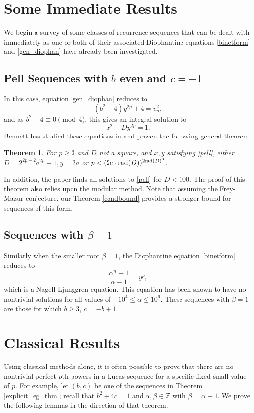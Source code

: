 \documentclass[12pt]{amsart}
\newtheorem{thm}{Theorem}[section]
\theoremstyle{definition}
\def\Z{{\mathbb Z}}
\newcommand{\rad}{{\rm{rad}}}
\begin{document}
\section{Some Immediate Results}

We begin a survey of some classes of recurrence sequences that can be dealt with immediately as one or both of their associated Diophantine equations \ref{binetform} and \ref{gen_diophan} have already been investigated.

\subsection{Pell Sequences with $b$ even and $c = -1$}

In this case, equation \ref{gen_diophan} reduces to
\[ (b^2-4)y^{2p}+4 = v_n^2, \]
and as $b^2-4 \equiv 0 \pmod{4}$, this gives an integral solution to 
\begin{equation}\label{pell} x^2 - Dy^{2p} = 1.\end{equation}
Bennett has studied these equations in \cite{bennett05} and proven the following general theorem
\begin{thm}
For $p \geq 3$ and $D$ not a square, and $x,y$ satisfying \ref{pell}, either $D = 2^{2p-2}a^{2p}-1, y = 2a$ or $p < (2e\cdot \rad(D))^{2\rad(D)^3}$.
\end{thm}
In addition, the paper finds all solutions to \ref{pell} for $D< 100$.  The proof of this theorem also relies upon the modular method.  Note that assuming the Frey-Mazur conjecture, our Theorem \ref{condbound} provides a stronger bound for sequences of this form. 

\subsection{Sequences with $\beta = 1$}

Similarly when the smaller root $\beta=1$, the Diophantine equation \ref{binetform} reduces to 
\[ \frac{\alpha^n - 1}{\alpha - 1} = y^p, \]
which is a Nagell-Ljunggren equation.  This equation has been shown to have no nontrivial solutions for all values of $-10^4 \leq \alpha \leq 10^6$.  These sequences with $\beta = 1$ are those for which $b \geq 3$, $c = -b+1$.  


\section{Classical Results}

Using classical methods alone, it is often possible to prove that there are no nontrivial perfect $p$th powers in a Lucas sequence for a specific fixed small value of $p$.  For example, let $(b,c)$ be one of the sequences in Theorem \ref{explicit_eg_thm}; recall that $b^2+4c = 1$ and $\alpha,\beta \in \Z$ with $\beta = \alpha-1$.  We prove the following lemmas in the direction of that theorem.
\end{document}
